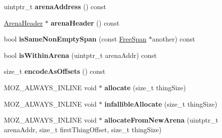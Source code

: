 \begin{DoxyCompactItemize}
\item 
\hypertarget{structjs_1_1gc_1_1_free_span_adc3946a88b36f8fdb59682cb8c7ec34d}{uintptr\-\_\-t {\bfseries arena\-Address} () const }\label{structjs_1_1gc_1_1_free_span_adc3946a88b36f8fdb59682cb8c7ec34d}

\item 
\hypertarget{structjs_1_1gc_1_1_free_span_ad13f966786a54e3bac8fc79e075a3156}{\hyperlink{structjs_1_1gc_1_1_arena_header}{Arena\-Header} $\ast$ {\bfseries arena\-Header} () const }\label{structjs_1_1gc_1_1_free_span_ad13f966786a54e3bac8fc79e075a3156}

\item 
\hypertarget{structjs_1_1gc_1_1_free_span_ac6dc9952fdd856219bbe93c4a4d3386b}{bool {\bfseries is\-Same\-Non\-Empty\-Span} (const \hyperlink{structjs_1_1gc_1_1_free_span}{Free\-Span} $\ast$another) const }\label{structjs_1_1gc_1_1_free_span_ac6dc9952fdd856219bbe93c4a4d3386b}

\item 
\hypertarget{structjs_1_1gc_1_1_free_span_a4533af044d5d42385421140e5e96f251}{bool {\bfseries is\-Within\-Arena} (uintptr\-\_\-t arena\-Addr) const }\label{structjs_1_1gc_1_1_free_span_a4533af044d5d42385421140e5e96f251}

\item 
\hypertarget{structjs_1_1gc_1_1_free_span_abf5e1a69051aa04a4392dac5a7c8e684}{size\-\_\-t {\bfseries encode\-As\-Offsets} () const }\label{structjs_1_1gc_1_1_free_span_abf5e1a69051aa04a4392dac5a7c8e684}

\item 
\hypertarget{structjs_1_1gc_1_1_free_span_a261a76556a4b2f74d549385e7ed0c175}{M\-O\-Z\-\_\-\-A\-L\-W\-A\-Y\-S\-\_\-\-I\-N\-L\-I\-N\-E void $\ast$ {\bfseries allocate} (size\-\_\-t thing\-Size)}\label{structjs_1_1gc_1_1_free_span_a261a76556a4b2f74d549385e7ed0c175}

\item 
\hypertarget{structjs_1_1gc_1_1_free_span_a32bf8a5cec67f6c4a0bb4d9aba1a2dee}{M\-O\-Z\-\_\-\-A\-L\-W\-A\-Y\-S\-\_\-\-I\-N\-L\-I\-N\-E void $\ast$ {\bfseries infallible\-Allocate} (size\-\_\-t thing\-Size)}\label{structjs_1_1gc_1_1_free_span_a32bf8a5cec67f6c4a0bb4d9aba1a2dee}

\item 
\hypertarget{structjs_1_1gc_1_1_free_span_a042819545b290443454e638d06a9c720}{M\-O\-Z\-\_\-\-A\-L\-W\-A\-Y\-S\-\_\-\-I\-N\-L\-I\-N\-E void $\ast$ {\bfseries allocate\-From\-New\-Arena} (uintptr\-\_\-t arena\-Addr, size\-\_\-t first\-Thing\-Offset, size\-\_\-t thing\-Size)}\label{structjs_1_1gc_1_1_free_span_a042819545b290443454e638d06a9c720}


\end{DoxyCompactItemize}
